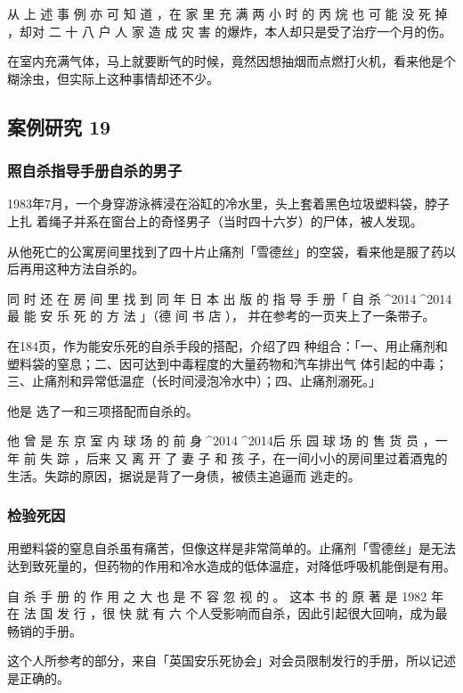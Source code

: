 \documentclass[UTF8]{ctexart}
\begin{document}
从 上 述 事 例 亦 可 知 道 ，在 家 里 充 满 两 小 时 的 丙 烷 也 可 能 没 死 掉 ，却对 二 十 八 户 人 家 造 成 灾 害 的爆炸，本人却只是受了治疗一个月的伤。

在室内充满气体，马上就要断气的时候，竟然因想抽烟而点燃打火机，看来他是个糊涂虫，但实际上这种事情却还不少。


\subsection{案例研究 19}

\subsubsection*{照自杀指导手册自杀的男子}

1983年7月，一个身穿游泳裤浸在浴缸的冷水里，头上套着黑色垃圾塑料袋，脖子上扎
着绳子并系在窗台上的奇怪男子（当时四十六岁）的尸体，被人发现。

从他死亡的公寓房间里找到了四十片止痛剂「雪德丝」的空袋，看来他是服了药以后再用这种方法自杀的。

同 时 还 在 房 间 里 找 到 同 年 日 本 出 版 的 指 导 手 册「 自 杀^^^^2014^^^^2014最 能 安 乐 死 的 方 法 」（德 间 书 店 ）， 并在参考的一页夹上了一条带子。

在184页，作为能安乐死的自杀手段的搭配，介绍了四 种组合：「一、用止痛剂和塑料袋的窒息；二、因可达到中毒程度的大量药物和汽车排出气 体引起的中毒；三、止痛剂和异常低温症（长时间浸泡冷水中）；四、止痛剂溺死。」

他是 选了一和三项搭配而自杀的。 

他 曾 是 东 京 室 内 球 场 的 前 身^^^^2014^^^^2014后 乐 园 球 场 的 售 货 员 ，一 年 前 失 踪 ，后来 又 离 开 了 妻 子 和 孩 子，在一间小小的房间里过着酒鬼的生活。失踪的原因，据说是背了一身债，被债主追逼而 逃走的。

\subsubsection*{检验死因}

用塑料袋的窒息自杀虽有痛苦，但像这样是非常简单的。止痛剂「雪德丝」是无法达到致死量的，但药物的作用和冷水造成的低体温症，对降低呼吸机能倒是有用。

自 杀 手 册 的 作 用 之 大 也 是 不 容 忽 视 的 。
这本 书 的 原 著 是 1982 年 在 法 国 发 行 ，很 快 就 有 六 个人受影响而自杀，因此引起很大回响，成为最畅销的手册。

这个人所参考的部分，来自「英国安乐死协会」对会员限制发行的手册，所以记述是正确的。
\end{document}
